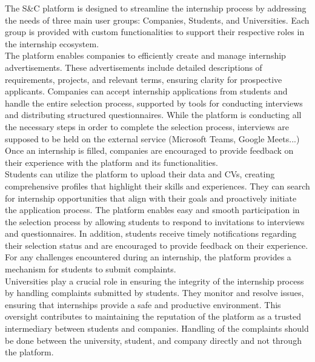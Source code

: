 

The S\&C platform is designed to streamline the internship process by addressing the needs of three main user groups: Companies, Students, and Universities. Each group is provided with custom functionalities to support their respective roles in the internship ecosystem. \\

The platform enables companies to efficiently create and manage internship advertisements. These advertisements include detailed descriptions of requirements, projects, and relevant terms, ensuring clarity for prospective applicants. Companies can accept internship applications from students and handle the entire selection process, supported by tools for conducting interviews and distributing structured questionnaires. While the platform is conducting all the necessary steps in order to complete the selection process, interviews are supposed to be held on the external service (Microsoft Teams, Google Meets...) Once an internship is filled, companies are encouraged to provide feedback on their experience with the platform and its functionalities. \\

Students can utilize the platform to upload their data and CVs, creating comprehensive profiles that highlight their skills and experiences. They can search for internship opportunities that align with their goals and proactively initiate the application process. The platform enables easy and smooth participation in the selection process by allowing students to respond to invitations to interviews and questionnaires. In addition, students receive timely notifications regarding their selection status and are encouraged to provide feedback on their experience. For any challenges encountered during an internship, the platform provides a mechanism for students to submit complaints. \\

Universities play a crucial role in ensuring the integrity of the internship process by handling complaints submitted by students. They monitor and resolve issues, ensuring that internships provide a safe and productive environment. This oversight contributes to maintaining the reputation of the platform as a trusted intermediary between students and companies. Handling of the complaints should be done between the university, student, and company directly and not through the platform.

